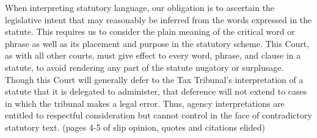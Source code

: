 \documentclass[12pt,\documentclassflag]{michiganCourtOfAppealsBrief}
\begin{document}
When interpreting statutory language, our obligation is to ascertain the legislative intent that may reasonably be inferred from the words expressed in the statute. This requires us to consider the plain meaning of the critical word or phrase as well as its placement and purpose in the statutory scheme. This Court, as with all other courts, must give effect to every word, phrase, and clause in a statute, to avoid rendering any part of the statute nugatory or surplusage. Though this Court will generally defer to the Tax Tribunal's interpretation of a statute that it is delegated to administer, that deference will not extend to cases in which the tribunal makes a legal error. Thus, agency interpretations are entitled to respectful consideration but cannot control in the face of contradictory statutory text. (pages 4-5 of slip opinion, quotes and citations elided)
 
\end{document}
